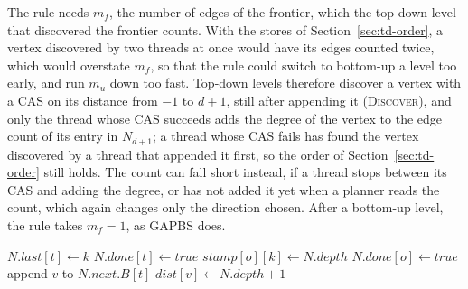 The rule needs $m_f$, the number of edges of the frontier, which the top-down level that discovered the frontier counts. With the stores of Section~\ref{sec:td-order}, a vertex discovered by two threads at once would have its edges counted twice, which would overstate $m_f$, so that the rule could switch to bottom-up a level too early, and run $m_u$ down too fast. Top-down levels therefore discover a vertex with a CAS on its distance from $-1$ to $d+1$, still after appending it (\textsc{Discover}), and only the thread whose CAS succeeds adds the degree of the vertex to the edge count of its entry in $N_{d+1}$; a thread whose CAS fails has found the vertex discovered by a thread that appended it first, so the order of Section~\ref{sec:td-order} still holds. The count can fall short instead, if a thread stops between its CAS and adding the degree, or has not added it yet when a planner reads the count, which again changes only the direction chosen. After a bottom-up level, the rule takes $m_f = 1$, as GAPBS does.

\begin{algorithm}
\caption{A bottom-up level, as thread $t$ runs it. $X_{o,k}$ is the $k$-th block of thread $o$, $K_o$ the number of its blocks, and every stamp starts at $-1$.}
\label{alg:wf-bu}
\begin{algorithmic}[1]
     \label{ln:bu-own}
        \State $N.\mathit{last}[t] \gets k$ \label{ln:bu-last}
    \EndFor
    \State $N.\mathit{done}[t] \gets \mathit{true}$
        \label{ln:bu-help}
                \State {}
                \State $\mathit{stamp}[o][k] \gets N.\mathit{depth}$ \label{ln:bu-stamp}
            \EndIf
        \EndFor
        \State $N.\mathit{done}[o] \gets \mathit{true}$
    \EndFor
\EndProcedure
\Statex
{}
         \label{ln:bu-test}
            \State append $v$ to $N.\mathit{next}.B[t]$ \label{ln:bu-append}
            \State $\mathit{dist}[v] \gets N.\mathit{depth} + 1$ \label{ln:bu-dist}
        \EndIf
    \EndFor
\EndProcedure
\end{algorithmic}
\end{algorithm}

